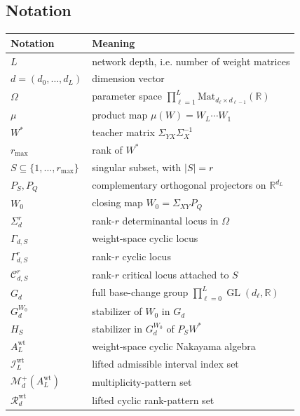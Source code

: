 \documentclass[11pt]{article}
\newcommand{\GL}{\operatorname{GL}}
\newcommand{\Mat}{\mathrm{Mat}}
\newcommand{\R}{\mathbb{R}}
\theoremstyle{definition}
\begin{document}
\subsection{Notation}

\begin{center}
\renewcommand{\arraystretch}{1.15}
\begin{tabular}{p{} p{}}
\toprule
\textbf{Notation} & \textbf{Meaning} \\
\midrule
\(L\) & network depth, i.e. number of weight matrices \\
\(d=(d_0,\dots,d_L)\) & dimension vector \\
\(\Omega\) & parameter space \(\prod_{\ell=1}^L \Mat_{d_\ell\times d_{\ell-1}}(\R)\) \\
\(\mu\) & product map \(\mu(W)=W_L\cdots W_1\) \\
\(W^\ast\) & teacher matrix \(\Sigma_{YX}\Sigma_X^{-1}\) \\
\(r_{\max}\) & rank of \(W^\ast\) \\
\(S\subseteq \{1,\dots,r_{\max}\}\) & singular subset, with \(|S|=r\) \\
\(P_S,P_Q\) & complementary orthogonal projectors on \(\R^{d_L}\) \\
\(W_0\) & closing map \(W_0=\Sigma_{XY}P_Q\) \\
\(\Sigma_d^r\) & rank-\(r\) determinantal locus in \(\Omega\) \\
\(\Gamma_{d,S}\) & weight-space cyclic locus \\
\(\Gamma_{d,S}^r\) & rank-\(r\) cyclic locus \\
\(\mathcal C_{d,S}^r\) & rank-\(r\) critical locus attached to \(S\) \\
\(G_d\) & full base-change group \(\prod_{\ell=0}^L \GL(d_\ell,\R)\) \\
\(G_d^{W_0}\) & stabilizer of \(W_0\) in \(G_d\) \\
\(H_S\) & stabilizer in \(G_d^{W_0}\) of \(P_SW^\ast\) \\
\(A_L^{\mathrm{wt}}\) & weight-space cyclic Nakayama algebra \\
\(\mathcal I_L^{\mathrm{wt}}\) & lifted admissible interval index set \\
\(\mathcal M_d^+(A_L^{\mathrm{wt}})\) & multiplicity-pattern set \\
\(\mathcal R_d^{\mathrm{wt}}\) & lifted cyclic rank-pattern set \\
\bottomrule
\end{tabular}
\end{center}
\end{document}
